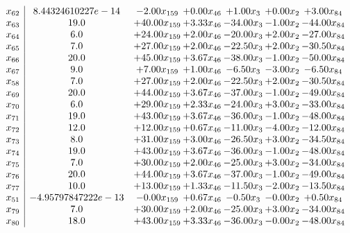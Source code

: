 \documentclass[8pt]{article}
\begin{document}
\[\begin{array}{c| c c@{\hskip 2pt} c@{\hskip 2pt} c@{\hskip 2pt} c@{\hskip 2pt} c@{\hskip 2pt} }
 x_{62}   &  8.44324610227e-14 & -2.00 x_{159} & +  0.00 x_{46} & +  1.00 x_{3} & +  0.00 x_{2} & +  3.00 x_{84}\\
 x_{63}   &  19.0 & + 40.00 x_{159} & +  3.33 x_{46} & -34.00 x_{3} & -1.00 x_{2} & -44.00 x_{84}\\
 x_{64}   &  6.0 & + 24.00 x_{159} & +  2.00 x_{46} & -20.00 x_{3} & +  2.00 x_{2} & -27.00 x_{84}\\
 x_{65}   &  7.0 & + 27.00 x_{159} & +  2.00 x_{46} & -22.50 x_{3} & +  2.00 x_{2} & -30.50 x_{84}\\
 x_{66}   &  20.0 & + 45.00 x_{159} & +  3.67 x_{46} & -38.00 x_{3} & -1.00 x_{2} & -50.00 x_{84}\\
 x_{67}   &  9.0 & +  7.00 x_{159} & +  1.00 x_{46} & -6.50 x_{3} & -3.00 x_{2} & -6.50 x_{84}\\
 x_{58}   &  7.0 & + 27.00 x_{159} & +  2.00 x_{46} & -22.50 x_{3} & +  2.00 x_{2} & -30.50 x_{84}\\
 x_{69}   &  20.0 & + 44.00 x_{159} & +  3.67 x_{46} & -37.00 x_{3} & -1.00 x_{2} & -49.00 x_{84}\\
 x_{70}   &  6.0 & + 29.00 x_{159} & +  2.33 x_{46} & -24.00 x_{3} & +  3.00 x_{2} & -33.00 x_{84}\\
 x_{71}   &  19.0 & + 43.00 x_{159} & +  3.67 x_{46} & -36.00 x_{3} & -1.00 x_{2} & -48.00 x_{84}\\
 x_{72}   &  12.0 & + 12.00 x_{159} & +  0.67 x_{46} & -11.00 x_{3} & -4.00 x_{2} & -12.00 x_{84}\\
 x_{73}   &  8.0 & + 31.00 x_{159} & +  3.00 x_{46} & -26.50 x_{3} & +  3.00 x_{2} & -34.50 x_{84}\\
 x_{74}   &  19.0 & + 43.00 x_{159} & +  3.67 x_{46} & -36.00 x_{3} & -1.00 x_{2} & -48.00 x_{84}\\
 x_{75}   &  7.0 & + 30.00 x_{159} & +  2.00 x_{46} & -25.00 x_{3} & +  3.00 x_{2} & -34.00 x_{84}\\
 x_{76}   &  20.0 & + 44.00 x_{159} & +  3.67 x_{46} & -37.00 x_{3} & -1.00 x_{2} & -49.00 x_{84}\\
 x_{77}   &  10.0 & + 13.00 x_{159} & +  1.33 x_{46} & -11.50 x_{3} & -2.00 x_{2} & -13.50 x_{84}\\
 x_{51}   &  -4.95797847222e-13 & -0.00 x_{159} & +  0.67 x_{46} & -0.50 x_{3} & -0.00 x_{2} & +  0.50 x_{84}\\
 x_{79}   &  7.0 & + 30.00 x_{159} & +  2.00 x_{46} & -25.00 x_{3} & +  3.00 x_{2} & -34.00 x_{84}\\
 x_{80}   &  18.0 & + 43.00 x_{159} & +  3.33 x_{46} & -36.00 x_{3} & -0.00 x_{2} & -48.00 x_{84}\\

\end{array}\]
\end{document}
